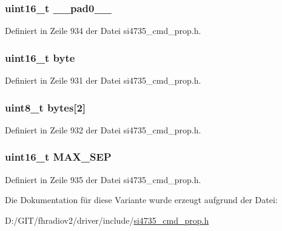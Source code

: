 \subsubsection[{\+\_\+\+\_\+pad0\+\_\+\+\_\+}]{\setlength{\rightskip}{0pt plus 5cm}uint16\+\_\+t \+\_\+\+\_\+pad0\+\_\+\+\_\+}\label{unionfm__blend__max__stereo__sepa_a77132c2c26a75f5b8751b235cda23828}


Definiert in Zeile 934 der Datei si4735\+\_\+cmd\+\_\+prop.\+h.

\hypertarget{unionfm__blend__max__stereo__sepa_ab0549c1b5ea980a02e7eab77e21fea49}{}
\subsubsection[{byte}]{\setlength{\rightskip}{0pt plus 5cm}uint16\+\_\+t byte}\label{unionfm__blend__max__stereo__sepa_ab0549c1b5ea980a02e7eab77e21fea49}


Definiert in Zeile 931 der Datei si4735\+\_\+cmd\+\_\+prop.\+h.

\hypertarget{unionfm__blend__max__stereo__sepa_a46e4c05d20a047ec169f60d3167e912e}{}
\subsubsection[{bytes}]{\setlength{\rightskip}{0pt plus 5cm}uint8\+\_\+t bytes\mbox{[}2\mbox{]}}\label{unionfm__blend__max__stereo__sepa_a46e4c05d20a047ec169f60d3167e912e}


Definiert in Zeile 932 der Datei si4735\+\_\+cmd\+\_\+prop.\+h.

\hypertarget{unionfm__blend__max__stereo__sepa_aa66d0206353a48c2ce247b9951607855}{}
\subsubsection[{M\+A\+X\+\_\+\+S\+E\+P}]{\setlength{\rightskip}{0pt plus 5cm}uint16\+\_\+t M\+A\+X\+\_\+\+S\+E\+P}\label{unionfm__blend__max__stereo__sepa_aa66d0206353a48c2ce247b9951607855}


Definiert in Zeile 935 der Datei si4735\+\_\+cmd\+\_\+prop.\+h.



Die Dokumentation für diese Variante wurde erzeugt aufgrund der Datei\+:\begin{DoxyCompactItemize}
\item 
D\+:/\+G\+I\+T/fhradiov2/driver/include/\hyperlink{si4735__cmd__prop_8h}{si4735\+\_\+cmd\+\_\+prop.\+h}\end{DoxyCompactItemize}
